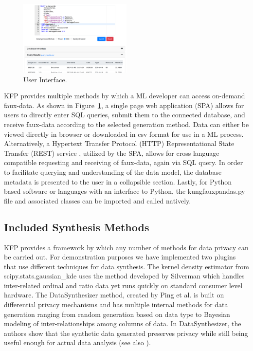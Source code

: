 \documentclass{article}
\begin{document}
\begin{figure}%
  \centering
  \includegraphics[width=0.5\textwidth]{ui_screenshot3}
  \caption{User Interface.}
  \label{fig:ui}
\end{figure}
KFP provides multiple methods by which a ML developer can access on-demand faux-data. As shown in Figure~\ref{fig:ui}, a single page web application (SPA) allows for users to directly enter SQL queries, submit them to the connected database, and receive faux-data according to the selected generation method. Data can either be viewed directly in browser or downloaded in csv format for use in a ML process. Alternatively, a Hypertext Transfer Protocol (HTTP) Representational State Transfer (REST) service \cite{w3c_working_group_webservices}, utilized by the SPA, allows for cross language compatible requesting and receiving of faux-data, again via SQL query. In order to facilitate querying and understanding of the data model, the database metadata is presented to the user in a collapsible section. Lastly, for Python based software or languages with an interface to Python, the kungfauxpandas.py file and associated classes can be imported and called natively.

\subsection{Included Synthesis Methods}

KFP provides a framework by which any number of methods for data privacy can be carried out. For demonstration purposes we have implemented two plugins that use different techniques for data synthesis. The kernel density estimator from scipy.stats.gaussian\_kde uses the method developed by Silverman \cite{silverman_density_1986} which handles inter-related ordinal and ratio data yet runs quickly on standard consumer level hardware. The DataSynthesizer method, created by Ping et al. \cite{ping17datasynthesizer} is built on differential privacy mechanisms and has multiple internal methods for data generation ranging from random generation based on data type to Bayesian modeling of inter-relationships among columns of data. In DataSynthesizer, the authors show that the synthetic data generated preserves privacy while still being useful enough for actual data analysis (see also \cite{howe_synthetic_2017}).
\end{document}
